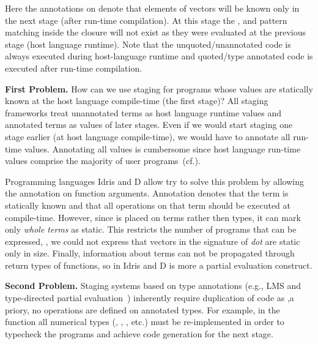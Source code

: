 Here the  annotations on  denote that elements of vectors will be known
 only in the next stage (after run-time compilation). At this stage the 
 , and pattern matching inside the closure will not exist
 as they were evaluated at the previous stage (host language runtime). Note that
 the unquoted/unannotated code is always executed during host-language runtime
 and quoted/type annotated code is executed after run-time compilation.

{\bf First Problem.} How can we use staging for programs whose values are statically
 known at the host language compile-time (the first stage)? All staging frameworks
 treat unannotated terms as host language runtime values and annotated terms as
 values of later stages. Even if we would start staging one stage earlier (at host language compile-time),
 we would have to annotate all run-time values. Annotating all values is cumbersome
 since host language run-time values comprise the majority of user programs~(cf.).


Programming languages Idris and D allow try to solve this problem by allowing
 the  annotation on function arguments. Annotation  denotes
 that the term is statically known and that all operations on that term should
 be executed at compile-time. However, since  is placed on terms rather
 then types, it can mark only \emph{whole terms} as static. This restricts the number
 of programs that can be expressed, \eg, we could not express that vectors in the
 signature of \emph{dot} are static only in size. Finally, information about 
 terms can not be propagated through return types of functions, so 
 in Idris and D is more a partial evaluation construct.

{\bf Second Problem.} Staging systems based on type annotations (e.g., LMS and type-directed
partial evaluation~\cite{danvy1999type}) inherently require duplication of code as
,a priory, no operations are defined on  annotated types. For example,
in the  function all numerical types (\eg, , , etc.)
must be re-implemented in order to typecheck the programs and achieve code generation
for the next stage.

